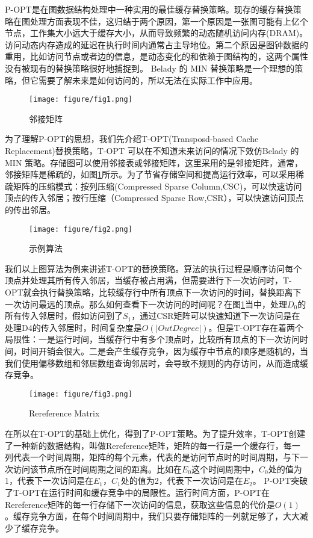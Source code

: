 \documentclass[10pt,journal,compsoc]{IEEEtran}
\begin{document}
P-OPT是在图数据结构处理中一种实用的最佳缓存替换策略\cite{balaji2021p}。现存的缓存替换策略在图处理方面表现不佳，这归结于两个原因，第一个原因是一张图可能有上亿个节点，工作集大小远大于缓存大小，从而导致频繁的动态随机访问内存(DRAM)。访问动态内存造成的延迟在执行时间内通常占主导地位。第二个原因是图钟数据的重用，比如访问节点或者边的信息，是动态变化的和依赖于图结构的，这两个属性没有被现有的替换策略很好地捕捉到。 Belady 的 MIN 替换策略是一个理想的策略，但它需要了解未来是如何访问的，所以无法在实际工作中应用。

\begin{figure}[!t]
\centering
\texttt{[image: figure/fig1.png]}
\caption{邻接矩阵}
\label{fig_1}
\end{figure}

为了理解P-OPT的思想，我们先介绍T-OPT(Transposd-based Cache Replacement)替换策略，T-OPT 可以在不知道未来访问的情况下效仿Belady 的 MIN 策略。存储图可以使用邻接表或邻接矩阵，这里采用的是邻接矩阵，通常，邻接矩阵是稀疏的，如图\ref{fig_1}所示。为了节省存储空间和提高运行效率，可以采用稀疏矩阵的压缩模式：按列压缩(Compressed Sparse Column,CSC)，可以快速访问顶点的传入邻居；按行压缩（Compressed Sparse Row,CSR），可以快速访问顶点的传出邻居。

\begin{figure}[!t]
\centering
\texttt{[image: figure/fig2.png]}
\caption{示例算法}
\label{fig_2}
\end{figure}

我们以上图算法为例来讲述T-OPT的替换策略。算法的执行过程是顺序访问每个顶点并处理其所有传入邻居，当缓存被占用满，但需要进行下一次访问时，T-OPT就会执行替换策略，比较缓存行中所有顶点下一次访问的时间，替换距离下一次访问最远的顶点。那么如何查看下一次访问的时间呢？在图\ref{fig_1}当中，处理$D_{0}$的所有传入邻居时，假如访问到了$S_{1}$，通过CSR矩阵可以快速知道下一次访问是在处理D4的传入邻居时，时间复杂度是$O(|Out Degree|)$。但是T-OPT存在着两个局限性：一是运行时间，当缓存行中有多个顶点时，比较所有顶点的下一次访问时间，时间开销会很大。二是会产生缓存竞争，因为缓存中节点的顺序是随机的，当我们使用偏移数组和邻居数组查询邻居时，会导致不规则的内存访问，从而造成缓存竞争。

\begin{figure}[!t]
\centering
\texttt{[image: figure/fig3.png]}
\caption{Rereference Matrix}
\label{fig_3}
\end{figure}

在所以在T-OPT的基础上优化，得到了P-OPT策略。为了提升效率，T-OPT创建了一种新的数据结构，叫做Rereference矩阵，矩阵的每一行是一个缓存行，每一列代表一个时间周期，矩阵的每个元素，代表的是访问节点时的时间周期，与下一次访问该节点所在时间周期之间的距离。比如在$E_{0}$这个时间周期中，$C_{0}$处的值为1，代表下一次访问是在$E_{1}$，$C_{1}$处的值为2，代表下一次访问是在$E_{2}$。
P-OPT突破了T-OPT在运行时间和缓存竞争中的局限性。运行时间方面，P-OPT在Rereference矩阵的每一行存储下一次访问的信息，获取这些信息的代价是$O(1)$。缓存竞争方面，在每个时间周期中，我们只要存储矩阵的一列就足够了，大大减少了缓存竞争。
\end{document}
